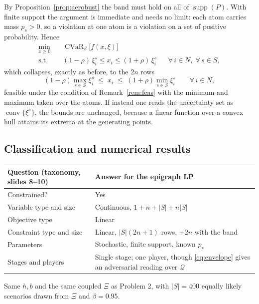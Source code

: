 \documentclass[11pt]{article}
\DeclareMathOperator*{\minimize}{min}
\DeclareMathOperator{\CVaR}{CVaR}
\DeclareMathOperator{\supp}{supp}
\DeclareMathOperator{\conv}{conv}
\theoremstyle{definition}
\begin{document}
By Proposition~\ref{prop:aerobust} the band must hold on all of
$\supp(P)$. With finite support the argument is immediate and needs no
limit: each atom carries mass $p_s > 0$, so a violation at one atom is a
violation on a set of positive probability. Hence
\begin{align}
  \minimize_{x \ge 0} \quad & \CVaR_\beta\big[ f(x,\xi) \big] \\
  \text{s.t.}\quad
    & (1-\rho)\,\xi^{s}_i \le x_i \le (1+\rho)\,\xi^{s}_i
      && \forall\, i \in N,\; \forall\, s \in S ,
\end{align}
which collapses, exactly as before, to the $2n$ rows
\[
  (1-\rho)\max_{s\in S}\xi^{s}_i \;\le\; x_i \;\le\;
  (1+\rho)\min_{s\in S}\xi^{s}_i \qquad \forall\, i \in N,
\]
feasible under the condition of Remark~\ref{rem:feas} with the minimum and
maximum taken over the atoms. If instead one reads the uncertainty set as
$\conv\{\xi^{s}\}$, the bounds are unchanged, because a linear function
over a convex hull attains its extrema at the generating points.

\subsection*{Classification and numerical results}

\begin{center}
\begin{tabular}{@{}ll@{}}
\toprule
Question (taxonomy, slides 8--10) & Answer for the epigraph LP \\
\midrule
Constrained?             & Yes \\
Variable type and size   & Continuous, $1+n+|S|+n|S|$ \\
Objective type           & Linear \\
Constraint type and size & Linear, $|S|(2n+1)$ rows, $+2n$ with the band \\
Parameters               & Stochastic, finite support, known $p_s$ \\
Stages and players       & Single stage; one player, though
                           \eqref{eq:envelope} gives an adversarial
                           reading over $\mathcal{Q}$ \\
\bottomrule
\end{tabular}
\end{center}

Same $h,b$ and the same coupled $\Xi$ as Problem 2, with $|S| = 400$
equally likely scenarios drawn from $\Xi$ and $\beta = 0.95$.
\end{document}
